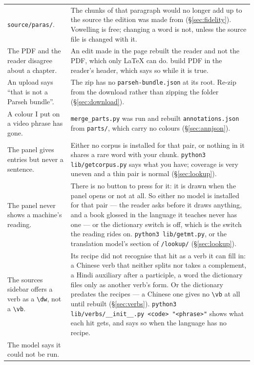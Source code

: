 \documentclass[11pt,oneside]{report}
\newcommand{\file}[1]{\texttt{#1}}
\newcommand{\menu}[1]{\textsf{#1}}
\begin{document}
\begin{center}
\begin{longtable}{@{}p{}p{}@{}}
\file{source/paras/}. &
  The chunks of that paragraph would no longer add up to the source the
  edition was made from (\S\ref{sec:fidelity}). Vowelling is free;
  changing a word is not, unless the source file is changed with it. \\
\addlinespace
The PDF and the reader disagree about a chapter. &
  An edit made in the page rebuilt the reader and not the PDF, which only
  LaTeX can do. \menu{build PDF} in the reader's header, which says so
  while it is true. \\
\addlinespace
An upload says ``that is not a Parseh bundle''. &
  The zip has no \file{parseh-bundle.json} at its root. Re-zip from the
  download rather than zipping the folder
  (\S\ref{sec:download}). \\
\addlinespace
A colour I put on a video phrase has gone. &
  \file{merge\_parts.py} was run and rebuilt \file{annotations.json}
  from \file{parts/}, which carry no colours
  (\S\ref{sec:annjson}). \\
\addlinespace
The panel gives entries but never a sentence. &
  Either no corpus is installed for that pair, or nothing in it shares a rare
  word with your chunk. \file{python3 lib/getcorpus.py} says what you have;
  coverage is very uneven and a thin pair is normal (\S\ref{sec:lookup}). \\
\addlinespace
The panel never shows a machine's reading. &
  There is no button to press for it: it is drawn when the panel opens or
  not at all. So either no model is installed for that pair --- the reader
  asks before it draws anything, and a book glossed in the language it
  teaches never has one --- or the \menu{dictionary} switch is off, which is
  the switch the reading rides on. \file{python3 lib/getmt.py}, or the
  translation model's section of \texttt{/lookup/} (\S\ref{sec:lookup}). \\
\addlinespace
The sources sidebar offers a verb as a \texttt{\textbackslash dw}, not a
\texttt{\textbackslash vb}. &
  Its recipe did not recognise that hit as a verb it can fill in: a Chinese
  verb that neither splits nor takes a complement, a Hindi auxiliary after a
  participle, a word the dictionary files only as another verb's form. Or
  the dictionary predates the recipes --- a Chinese one gives no
  \texttt{\textbackslash vb} at all until rebuilt (\S\ref{sec:verbs}).
  \file{python3 lib/verbs/\_\_init\_\_.py <code> "<phrase>"} shows what each
  hit gets, and says so when the language has no recipe. \\
\addlinespace
The model says it could not be run. &

\end{longtable}
\end{center}
\end{document}
